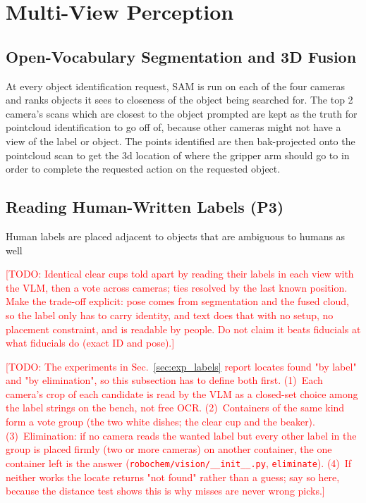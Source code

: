 \documentclass[letterpaper, 10pt, journal, twoside]{IEEEtran}}
\newcommand{\todo}[1]{\textcolor{red}{[TODO: #1]}}
\begin{document}
\section{Multi-View Perception}
\label{sec:perception}

\subsection{Open-Vocabulary Segmentation and 3D Fusion}

At every object identification request, SAM is run on each of the four cameras and ranks objects it sees to closeness of the object being searched for. The top 2 camera's scans which are closest to the object prompted are kept as the truth for pointcloud identification to go off of, because other cameras might not have a view of the label or object. The points identified are then bak-projected onto the pointcloud scan to get the 3d location of where the gripper arm should go to in order to complete the requested action on the requested object. 

\subsection{Reading Human-Written Labels (P3)}

Human labels are placed adjacent to objects that are ambiguous to humans
as well

\todo{Identical clear cups told apart by reading their labels in each view
with the VLM, then a vote across cameras; ties resolved by the last known
position. Make the trade-off explicit: pose comes from segmentation and
the fused cloud, so the label only has to carry identity, and text does
that with no setup, no placement constraint, and is readable by people.
Do not claim it beats fiducials at what fiducials do (exact ID and pose).}

\todo{The experiments in Sec.~\ref{sec:exp_labels} report locates found
"by label" and "by elimination", so this subsection has to define both
first. (1)~Each camera's crop of each candidate is read by the VLM as a
closed-set choice among the label strings on the bench, not free OCR.
(2)~Containers of the same kind form a vote group (the two white dishes;
the clear cup and the beaker). (3)~Elimination: if no camera reads the
wanted label but every other label in the group is placed firmly (two or
more cameras) on another container, the one container left is the
answer (\texttt{robochem/vision/\_\_init\_\_.py}, \texttt{eliminate}). (4)~If
neither works the locate returns "not found" rather than a guess; say so
here, because the distance test shows this is why misses are never wrong
picks.}
\end{document}

